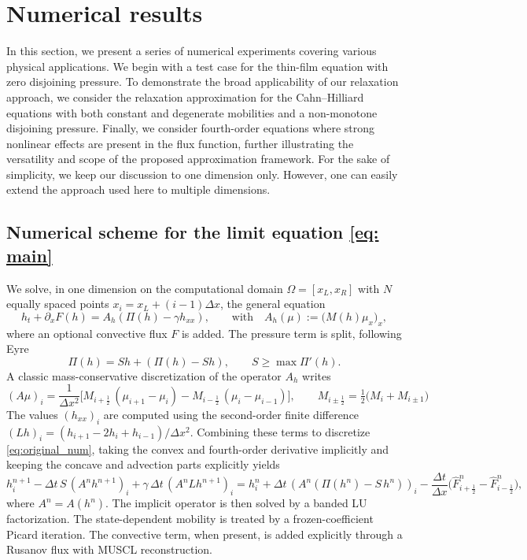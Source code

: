 \documentclass[11pt]{article}
\numberwithin{equation}{section}
\newtheorem{counter example}[theorem]{Counter Example}
\newcommand{\dx}{\Delta x}
\numberwithin{equation}{section}
\numberwithin{equation}{section}
\newcommand{\prn}[1]{\left( #1 \right)}
\newcommand{\hlf}{\frac{1}{2}}
\newcommand{\dt}{\Delta t}
\begin{document}
\section{Numerical results}\label{sec: numerics}
In this section, we present a series of numerical experiments covering various physical applications. We begin with a test case for the thin-film equation with zero disjoining pressure. To demonstrate the broad applicability of our relaxation approach, we consider the relaxation approximation for the Cahn–Hilliard equations with both constant and degenerate mobilities and a non-monotone disjoining pressure. Finally, we consider fourth-order equations where strong nonlinear effects are present in the flux function, further illustrating the versatility and scope of the proposed approximation framework.
For the sake of simplicity, we keep our discussion to one dimension only. However, one can easily extend the approach used here to multiple dimensions.
\subsection{Numerical scheme for the limit equation \eqref{eq: main}}
We solve, in one dimension on the computational domain $\Omega= [x_L,x_R]$ with $N$ equally spaced points
$x_i=x_L+(i-1)\dx$, the general equation
\begin{equation}
	h_t + \partial_x F(h)= A_h(\Pi(h)-\gamma h_{xx}), \qquad \text{with} \quad  A_h(\mu):=\big(M(h) \mu_x\big)_x ,
	\label{eq:original_num}
\end{equation}
where an optional convective flux $F$ is added. The pressure term is split, following Eyre \cite{eyre1998unconditionally} 
\begin{equation*}
	\Pi(h) = S h + (\Pi(h) - S h), \qquad S \geq \max \Pi'(h).
\end{equation*}
A classic mass-conservative discretization of the operator $A_h$ writes 
\begin{equation*}
	\prn{A \mu}_i = \frac{1}{\dx^2}\Big[
	M_{i+\hlf}\,(\mu_{i+1}-\mu_i)-M_{i-\hlf}\,(\mu_{i}-\mu_{i-1})\Big],
	\qquad M_{i\pm\hlf}=\tfrac12\big(M_i+M_{i\pm1}\big) 
\end{equation*}
The values $\prn{h_{xx}}_i$ are computed using the second-order finite difference $(Lh)_i=(h_{i+1}-2h_i+h_{i-1})/\dx^2$.
Combining these terms to discretize \eqref{eq:original_num}, taking the convex and fourth-order derivative implicitly and keeping the concave and advection parts explicitly yields
\begin{equation*}
		h_i^{n+1}
		-\dt\,S\,(A^n h^{n+1})_i
		+\gamma\,\dt\,(A^n Lh^{n+1})_i = h_i^n+\dt\,(A^n\prn{\Pi(h^n)-S\,h^n})_i
		-\frac{\dt}{\dx}\big(\hat F^n_{i+\hlf}-\hat F^n_{i-\hlf}\big),
\end{equation*}
where $A^n = A(h^n)$. The implicit operator is then solved by a banded LU factorization.  
The state-dependent mobility is treated by a frozen-coefficient Picard iteration. The
convective term, when present, is added explicitly through a Rusanov flux with MUSCL reconstruction.
\end{document}
